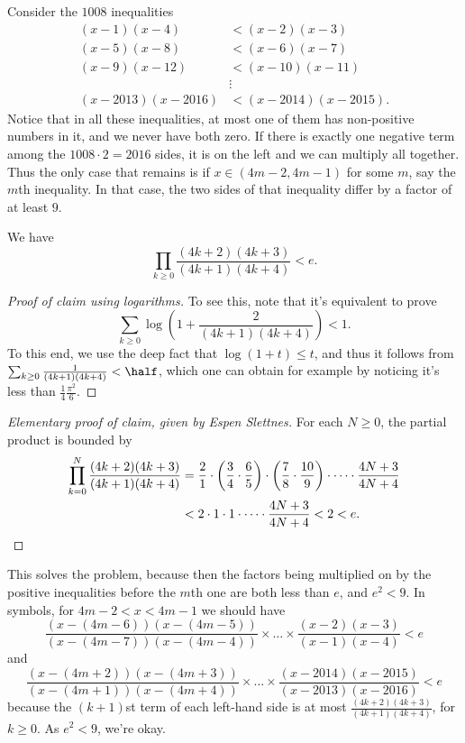 \documentclass[11pt]{scrartcl}
\begin{document}
Consider the $1008$ inequalities
\begin{align*}
 (x-1)(x-4) &< (x-2)(x-3) \\
 (x-5)(x-8) &< (x-6)(x-7) \\
 (x-9)(x-12) &< (x-10)(x-11) \\
 &\vdots \\
 (x-2013)(x-2016) &< (x-2014)(x-2015).
\end{align*}
Notice that in all these inequalities, at most one of them
has non-positive numbers in it, and we never have both zero.
If there is exactly one negative term among the $1008 \cdot 2 = 2016$ sides,
it is on the left and we can multiply all together.
Thus the only case that remains is if $x \in (4m-2, 4m-1)$ for some $m$,
say the $m$th inequality.
In that case, the two sides of that inequality differ by a factor of at least $9$.

\begin{claim*}
We have \[ \prod_{k \ge 0} \frac{(4k+2)(4k+3)}{(4k+1)(4k+4)} < e. \]
\end{claim*}
\begin{proof}
[Proof of claim using logarithms]
To see this, note that it's equivalent to prove
\[ \sum_{k \ge 0} \log \left( 1 + \frac{2}{(4k+1)(4k+4)} \right) < 1. \]
To this end, we use the deep fact that $\log(1+t) \le t$,
and thus it follows from
$\sum_{k \ge 0} \frac{1}{(4k+1)(4k+4)} < \half$,
which one can obtain for example by noticing
it's less than $\frac14\frac{\pi^2}{6}$.
\end{proof}
\begin{proof}
[Elementary proof of claim, given by Espen Slettnes]
For each $N \ge 0$, the partial product is bounded by
\begin{align*}
  \prod_{k=0}^N \frac{(4k+2)(4k+3)}{(4k+1)(4k+4)}
  &=
  \frac 21 \cdot \left( \frac 34 \cdot \frac 65 \right)
    \cdot \left( \frac 78 \cdot \frac{10}{9} \right) \cdot \dots
    \cdot \frac{4N+3}{4N+4} \\
  &< 2 \cdot 1 \cdot 1 \cdot \dots \cdot \frac{4N+3}{4N+4}
  < 2 < e. \qedhere
\end{align*}
\end{proof}

This solves the problem,
because then the factors being multiplied
on by the positive inequalities before the
$m$th one are both less than $e$, and $e^2 < 9$.
In symbols, for $4m-2 < x < 4m-1$ we should have
\[
  \frac{(x-(4m-6))(x-(4m-5))}{(x-(4m-7))(x-(4m-4))}
  \times
  \dots
  \times
  \frac{(x-2)(x-3)}{(x-1)(x-4)}
  < e \]
and
\[
  \frac{(x-(4m+2))(x-(4m+3))}{(x-(4m+1))(x-(4m+4))}
  \times
  \dots
  \times
  \frac{(x-2014)(x-2015)}{(x-2013)(x-2016)}
  < e
\]
because the $(k+1)$st term of each left-hand side
is at most $\frac{(4k+2)(4k+3)}{(4k+1)(4k+4)}$, for $k \ge 0$.
As $e^2 < 9$, we're okay.
\pagebreak
\end{document}
